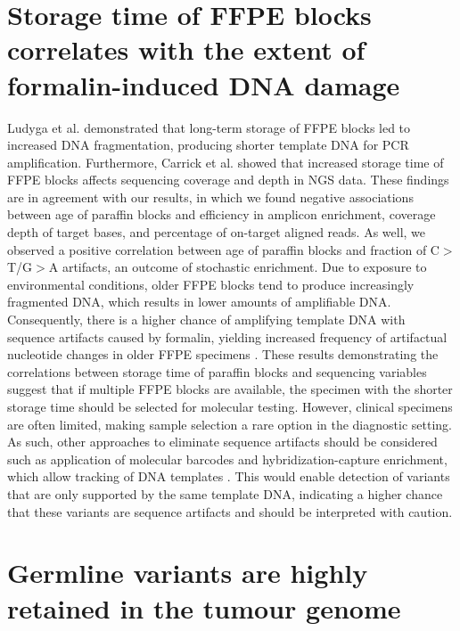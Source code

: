 \section{Storage time of FFPE blocks correlates with the extent of formalin-induced DNA damage}
\label{sec:StoragetimeofFFPEblockscorrelateswiththeextentofformalin-inducedDNAdamage}

Ludyga et al. \cite{Ludyga2012} demonstrated that long-term storage of FFPE blocks led to increased DNA fragmentation, producing shorter template DNA for PCR amplification. Furthermore, Carrick et al. \cite{Carrick2015} showed that increased storage time of FFPE blocks affects sequencing coverage and depth in NGS data. These findings are in agreement with our results, in which we found negative associations between age of paraffin blocks and efficiency in amplicon enrichment, coverage depth of target bases, and percentage of on-target aligned reads. As well, we observed a positive correlation between age of paraffin blocks and fraction of C$>$T/G$>$A artifacts, an outcome of stochastic enrichment. Due to exposure to environmental conditions, older FFPE blocks tend to produce increasingly fragmented DNA, which results in lower amounts of amplifiable DNA. Consequently, there is a higher chance of amplifying template DNA with sequence artifacts caused by formalin, yielding increased frequency of artifactual nucleotide changes in older FFPE specimens \cite{Wong2014}. These results demonstrating the correlations between storage time of paraffin blocks and sequencing variables suggest that if multiple FFPE blocks are available, the specimen with the shorter storage time should be selected for molecular testing. However, clinical specimens are often limited, making sample selection a rare option in the diagnostic setting. As such, other approaches to eliminate sequence artifacts should be considered such as application of molecular barcodes and hybridization-capture enrichment, which allow tracking of DNA templates \cite{Eijkelenboom2016, Samorodnitsky2015, Peng2015, Wong2013}. This would enable detection of variants that are only supported by the same template DNA, indicating a higher chance that these variants are sequence artifacts and should be interpreted with caution.

\section{Germline variants are highly retained in the tumour genome}
\label{sec:Germlinevariantsarehighlyretainedinthetumourgenome}

